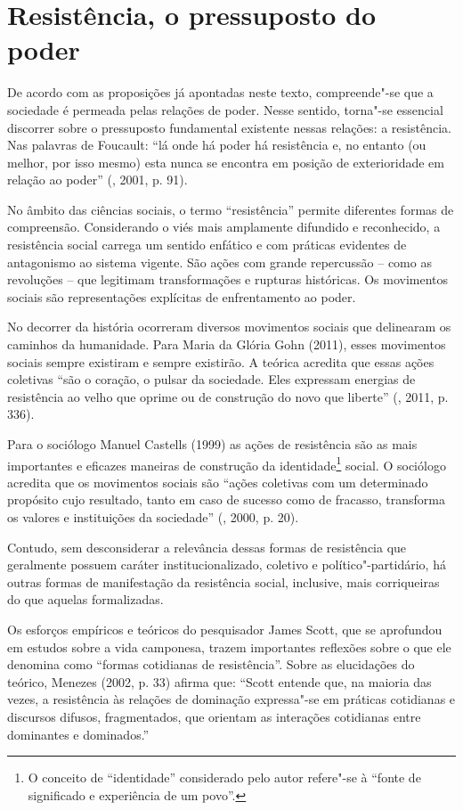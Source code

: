 \section{Resistência, o pressuposto do poder}

De acordo com as proposições já apontadas neste texto, compreende"-se que
a sociedade é permeada pelas relações de poder. Nesse sentido, torna"-se
essencial discorrer sobre o pressuposto fundamental existente nessas
relações: a resistência. Nas palavras de Foucault: ``lá onde há poder há
resistência e, no entanto (ou melhor, por isso mesmo) esta nunca se
encontra em posição de exterioridade em relação ao poder'' (,
2001, p. 91).

No âmbito das ciências sociais, o termo ``resistência'' permite
diferentes formas de compreensão. Considerando o viés mais amplamente
difundido e reconhecido, a resistência social carrega um sentido
enfático e com práticas evidentes de antagonismo ao sistema vigente. São
ações com grande repercussão -- como as revoluções -- que legitimam
transformações e rupturas históricas. Os movimentos sociais são
representações explícitas de enfrentamento ao poder.

No decorrer da história ocorreram diversos movimentos sociais que
delinearam os caminhos da humanidade. Para Maria da Glória Gohn (2011),
esses movimentos sociais sempre existiram e sempre existirão. A teórica
acredita que essas ações coletivas ``são o coração, o pulsar da
sociedade. Eles expressam energias de resistência ao velho que oprime ou
de construção do novo que liberte'' (, 2011, p. 336).

Para o sociólogo Manuel Castells (1999) as ações de resistência são as
mais importantes e eficazes maneiras de construção da
identidade\footnote{O conceito de ``identidade'' considerado pelo autor
  refere"-se à ``fonte de significado e experiência de um povo''.} social.
O sociólogo acredita que os movimentos sociais são ``ações coletivas com
um determinado propósito cujo resultado, tanto em caso de sucesso como
de fracasso, transforma os valores e instituições da sociedade''
(, 2000, p. 20).

Contudo, sem desconsiderar a relevância dessas formas de resistência que
geralmente possuem caráter institucionalizado, coletivo e
político"-partidário, há outras formas de manifestação da resistência
social, inclusive, mais corriqueiras do que aquelas formalizadas.

Os esforços empíricos e teóricos do pesquisador James Scott, que se
aprofundou em estudos sobre a vida camponesa, trazem importantes
reflexões sobre o que ele denomina como ``formas cotidianas de
resistência''. Sobre as elucidações do teórico, Menezes (2002, p. 33)
afirma que: ``Scott entende que, na maioria das vezes, a resistência às
relações de dominação expressa"-se em práticas cotidianas e discursos
difusos, fragmentados, que orientam as interações cotidianas entre
dominantes e dominados.''

